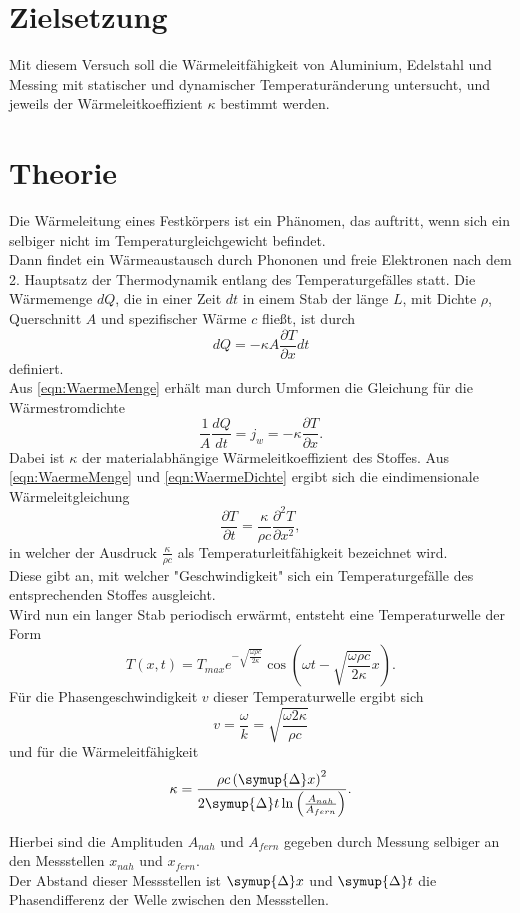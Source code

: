 \section{Zielsetzung}
\label{sec:Zielsetzung}
Mit diesem Versuch soll die Wärmeleitfähigkeit von Aluminium, Edelstahl und Messing
mit statischer und dynamischer Temperaturänderung untersucht, und jeweils der Wärmeleitkoeffizient $\kappa$ bestimmt werden.
\section{Theorie}
\label{sec:Theorie}
Die Wärmeleitung eines Festkörpers ist ein Phänomen, das auftritt, wenn sich ein selbiger nicht im Temperaturgleichgewicht
befindet. \\
Dann findet ein Wärmeaustausch durch Phononen und freie Elektronen nach dem 2. Hauptsatz der Thermodynamik entlang des Temperaturgefälles statt.
Die Wärmemenge $dQ$, die in einer Zeit $dt$ in einem Stab der länge $L$, mit Dichte $\rho$, Querschnitt $A$ und spezifischer Wärme $c$ fließt, ist durch
\begin{equation}
    \label{eqn:WaermeMenge}
    dQ = -\kappa A\frac{\partial T}{\partial x}dt
\end{equation}
definiert.\\
Aus \eqref{eqn:WaermeMenge} erhält man durch Umformen die Gleichung für die Wärmestromdichte
\begin{equation}
    \label{eqn:WaermeDichte}
    \frac{1}{A}\frac{dQ}{dt} = j_w = -\kappa \frac{\partial T}{\partial x}.
\end{equation}
Dabei ist $\kappa$ der materialabhängige Wärmeleitkoeffizient des Stoffes.
Aus \eqref{eqn:WaermeMenge} und \eqref{eqn:WaermeDichte} ergibt sich die eindimensionale Wärmeleitgleichung
\begin{equation}
    \frac{\partial T}{\partial t} = \frac{\kappa}{\rho c}\frac{\partial^2 T}{\partial x^2},
\end{equation}
in welcher der Ausdruck $\frac{\kappa}{\rho c}$ als Temperaturleitfähigkeit bezeichnet wird. \\
Diese gibt an, mit welcher "Geschwindigkeit" sich ein Temperaturgefälle des entsprechenden Stoffes ausgleicht.
\\
Wird nun ein langer Stab periodisch erwärmt, entsteht eine Temperaturwelle der Form
\begin{equation}
    T\left(x,t\right) = T_{max}e^{-\sqrt{\frac{\omega \rho c}{2\kappa}}}\cos\left(\omega t - \sqrt{\frac{\omega \rho c}{2\kappa}}x\right).
\end{equation}
Für die Phasengeschwindigkeit $v$ dieser Temperaturwelle ergibt sich
\begin{equation}
    v = \frac{\omega}{k} = \sqrt{\frac{\omega 2 \kappa}{\rho c}}
\end{equation}
und für die Wärmeleitfähigkeit
\begin{equation}
    \label{eqn:kappa}
    \kappa = \frac{\rho c \left(\symup{\Delta}x\right)^2}{2\symup{\Delta}t\ln\left(\frac{A_{nah}}{A_{fern}}\right)}.
\end{equation}

Hierbei sind die Amplituden $A_{nah}$ und $A_{fern}$ gegeben durch Messung selbiger an den Messstellen $x_{nah}$ und $x_{fern}$.\\
Der Abstand dieser Messstellen ist $\symup{\Delta}x$ und $\symup{\Delta}t$ die Phasendifferenz der Welle zwischen den Messstellen.